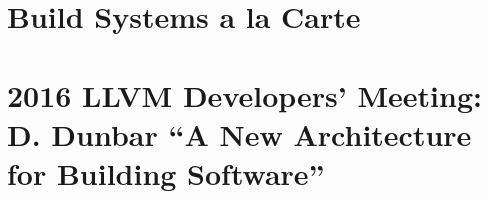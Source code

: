 \documentclass[12pt, a4paper]{report}
\begin{document}
\cite{hejlsberg_modern_compiler_construction}

\section*{Build Systems a la Carte}

\cite{mokhov2018build}

\section*{2016 LLVM Developers’ Meeting: D. Dunbar “A New Architecture for Building Software”}

\cite{dunbar2016}
\end{document}
